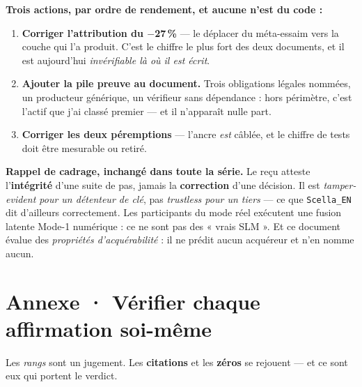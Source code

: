 \documentclass[10pt]{article}
\newcommand{\code}[1]{\texttt{\small #1}}
\newcommand{\pc}{\,\%}
\begin{document}
\textbf{Trois actions, par ordre de rendement, et aucune n'est du code :}

\begin{enumerate}[leftmargin=1.6em,itemsep=2.5pt,topsep=3pt]
\item \textbf{Corriger l'attribution du $-$27\pc} --- le déplacer du méta-essaim vers la couche qui l'a
      produit. C'est le chiffre le plus fort des deux documents, et il est aujourd'hui \emph{invérifiable
      là où il est écrit}.
\item \textbf{Ajouter la pile preuve au document.} Trois obligations légales nommées, un producteur
      générique, un vérifieur sans dépendance : hors périmètre, c'est l'actif que j'ai classé premier
      --- et il n'apparaît nulle part.
\item \textbf{Corriger les deux péremptions} --- l'ancre \emph{est} câblée, et le chiffre de tests doit
      être mesurable ou retiré.
\end{enumerate}

\begin{these}
\small\textbf{Rappel de cadrage, inchangé dans toute la série.} Le reçu atteste l'\textbf{intégrité}
d'une suite de pas, jamais la \textbf{correction} d'une décision. Il est \emph{tamper-evident pour un
détenteur de clé}, pas \emph{trustless pour un tiers} --- ce que \code{Scella\_EN} dit d'ailleurs
correctement. Les participants du mode réel exécutent une fusion latente Mode-1 numérique : ce ne sont
pas des « vrais SLM ». Et ce document évalue des \emph{propriétés d'acquérabilité} : il ne prédit aucun
acquéreur et n'en nomme aucun.
\end{these}

\section{Annexe · Vérifier chaque affirmation soi-même}

Les \emph{rangs} sont un jugement. Les \textbf{citations} et les \textbf{zéros} se rejouent --- et ce
sont eux qui portent le verdict.
\end{document}
